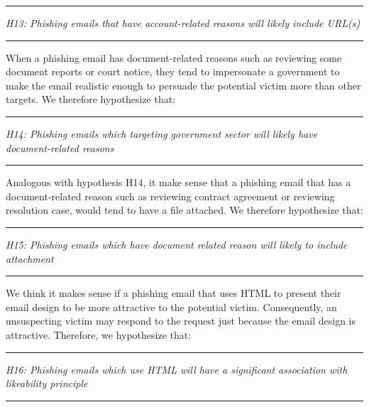 \rule[0.5ex]{1\columnwidth}{1pt}

\textit{H13: Phishing emails that have account-related reasons will
likely include URL(s) }

\rule[0.5ex]{1\columnwidth}{1pt}

When a phishing email has document-related reasons such as reviewing
some document reports or court notice, they tend to impersonate a
government to make the email realistic enough to persuade the potential
victim more than other targets. We therefore hypothesize that:

\rule[0.5ex]{1\columnwidth}{1pt}

\textit{H14: Phishing emails which targeting government sector will
likely have document-related reasons}

\rule[0.5ex]{1\columnwidth}{1pt}

Analogous with hypothesis H14, it make sense that a phishing email
that has a document-related reason such as reviewing contract agreement
or reviewing resolution case, would tend to have a file attached.
We therefore hypothesize that:

\rule[0.5ex]{1\columnwidth}{1pt}

\textit{H15: Phishing emails which have document related reason will
likely to include attachment}

\rule[0.5ex]{1\columnwidth}{1pt}

We think it makes sense if a phishing email that uses HTML to present
their email design to be more attractive to the potential victim.
Consequently, an unsuspecting victim may respond to the request just
because the email design is attractive. Therefore, we hypothesize
that:

\rule[0.5ex]{1\columnwidth}{1pt}

\textit{H16: Phishing emails which use HTML will have a significant
association with likeability principle}

\rule[0.5ex]{1\columnwidth}{1pt}%

